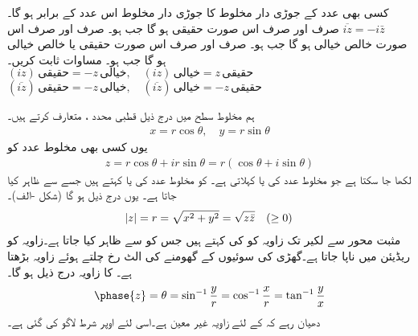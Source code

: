 \quad
کسی بھی  عدد کے جوڑی دار مخلوط کا جوڑی دار مخلوط اس عدد کے برابر ہو گا۔
\quad
$\overline{iz}=-i\bar{z}$
\quad
{} صرف اور صرف اس صورت حقیقی ہو گا جب  ہو۔
\quad
{} صرف اور صرف اس صورت خالص خیالی ہو گا جب  ہو۔
\quad
{} صرف اور صرف اس صورت حقیقی یا خالص خیالی ہو گا جب  ہو۔
\quad
مساوات  ثابت کریں۔
\quad
$(iz)\,\text{حقیقی}=-z\,\text{خیالی}, \quad (iz)\,\text{خیالی}=z\,\text{حقیقی}$
\quad
$(\overline{iz})\,\text{حقیقی}=-z\,\text{خیالی}, \quad (\overline{iz})\,\text{خیالی}=-z\,\text{حقیقی}$

ہم مخلوط سطح میں درج ذیل قطبی محدد ،  متعارف کرتے ہیں۔
\begin{align}
x=r\cos\theta,\quad y=r\sin\theta
\end{align}
یوں کسی بھی مخلوط عدد  کو
\begin{align}
z=r\cos\theta+ir\sin\theta=r(\cos\theta+i\sin\theta)
\end{align} 
لکھا جا سکتا ہے جو مخلوط عدد کی  یا  کہلاتی ہے۔ کو مخلوط عدد  کی  یا  کہتے ہیں جسے  سے ظاہر  کیا جاتا ہے۔ یوں درج ذیل ہو گا (شکل -الف)۔
\begin{align}
\abs{z}=r=\sqrt{x^2+y^2}=\sqrt{z\bar{z}}\quad (\ge 0)
\end{align}
مثبت  محور سے لکیر  تک زاویہ کو  کی  کہتے ہیں جس کو  سے ظاہر کیا جاتا ہے۔زاویہ کو ریڈیئن میں ناپا جاتا ہے۔گھڑی کی سوئیوں کے گھومنے کی الٹ رخ چلتے ہوئے زاویہ بڑھتا ہے۔ کا زاویہ درج ذیل ہو گا۔
\begin{align}  
\phase{z}=\theta=\sin^{-1}\frac{y}{r}=\cos^{-1}\frac{x}{r}=\tan^{-1}\frac{y}{x}
\end{align}
دھیان رہے کہ  کے لئے زاویہ  غیر معین ہے۔اسی لئے اوپر شرط  لاگو کی گئی ہے۔

